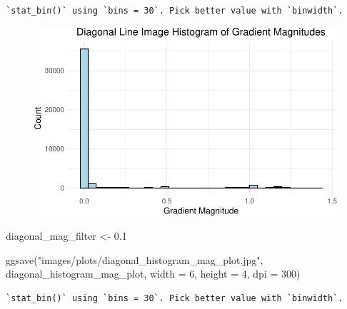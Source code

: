 \documentclass[
  letterpaper,
  DIV=11,
  numbers=noendperiod]{scrreprt}
\newenvironment{Shaded}{\begin{snugshade}}{\end{snugshade}}
\newcommand{\AttributeTok}[1]{\textcolor[rgb]{0.40,0.45,0.13}{#1}}
\newcommand{\DecValTok}[1]{\textcolor[rgb]{0.68,0.00,0.00}{#1}}
\newcommand{\FloatTok}[1]{\textcolor[rgb]{0.68,0.00,0.00}{#1}}
\newcommand{\FunctionTok}[1]{\textcolor[rgb]{0.28,0.35,0.67}{#1}}
\newcommand{\NormalTok}[1]{\textcolor[rgb]{0.00,0.23,0.31}{#1}}
\newcommand{\OtherTok}[1]{\textcolor[rgb]{0.00,0.23,0.31}{#1}}
\newcommand{\StringTok}[1]{\textcolor[rgb]{0.13,0.47,0.30}{#1}}
\begin{document}
\begin{verbatim}
`stat_bin()` using `bins = 30`. Pick better value with `binwidth`.
\end{verbatim}

\begin{figure}[H]

{\centering \includegraphics{results_files/figure-pdf/unnamed-chunk-9-5.pdf}

}

\end{figure}

\begin{Shaded}
\begin{Highlighting}[]
\NormalTok{diagonal\_mag\_filter }\OtherTok{\textless{}{-}} \FloatTok{0.1}

\FunctionTok{ggsave}\NormalTok{(}\StringTok{"images/plots/diagonal\_histogram\_mag\_plot.jpg"}\NormalTok{, diagonal\_histogram\_mag\_plot, }\AttributeTok{width =} \DecValTok{6}\NormalTok{, }\AttributeTok{height =} \DecValTok{4}\NormalTok{, }\AttributeTok{dpi =} \DecValTok{300}\NormalTok{)}
\end{Highlighting}
\end{Shaded}

\begin{verbatim}
`stat_bin()` using `bins = 30`. Pick better value with `binwidth`.
\end{verbatim}
\end{document}
